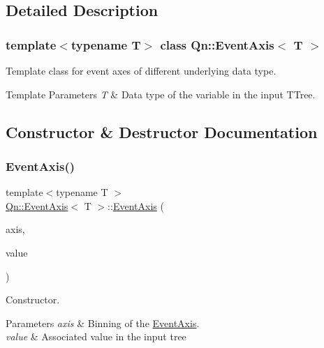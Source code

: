 \subsection{Detailed Description}
\subsubsection*{template$<$typename T$>$\newline
class Qn\+::\+Event\+Axis$<$ T $>$}

Template class for event axes of different underlying data type. 
\begin{DoxyTemplParams}{Template Parameters}
{\em T} & Data type of the variable in the input T\+Tree. \\
\hline
\end{DoxyTemplParams}


\subsection{Constructor \& Destructor Documentation}
\mbox{\label{classQn_1_1EventAxis_a801e914dd851f39aeab25b048d95a039}} 
\subsubsection{\texorpdfstring{Event\+Axis()}{EventAxis()}}
{\footnotesize\ttfamily template$<$typename T $>$ \\
\mbox{\hyperlink{classQn_1_1EventAxis}{Qn\+::\+Event\+Axis}}$<$ T $>$\+::\mbox{\hyperlink{classQn_1_1EventAxis}{Event\+Axis}} (\begin{DoxyParamCaption}\item[{const \mbox{\hyperlink{classQn_1_1Axis}{Qn\+::\+Axis}} \&}]{axis,  }\item[{T\+Tree\+Reader\+Value$<$ T $>$}]{value }\end{DoxyParamCaption})\hspace{0.3cm}{\ttfamily [inline]}}



Constructor. 


\begin{DoxyParams}{Parameters}
{\em axis} & Binning of the \mbox{\hyperlink{classQn_1_1EventAxis}{Event\+Axis}}. \\
\hline
{\em value} & Associated value in the input tree \\
\hline
\end{DoxyParams}


